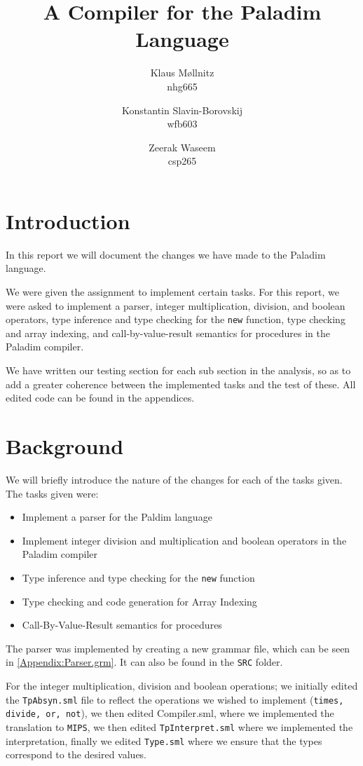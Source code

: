 \documentclass[10pt]{article}
\title{A Compiler for the \textbf{Paladim} Language}
\author{
    Klaus Møllnitz\\
    nhg665
  \and
    Konstantin Slavin-Borovskij\\
    wfb603
  \and
    Zeerak Waseem\\
    csp265
}
\begin{document}
\maketitle

\newpage
\tableofcontents
\section{Introduction}
In this report we will document the changes we have made to the Paladim language. 

We were given the assignment to implement certain tasks. For this report, we were asked to implement a parser, integer multiplication, division, and boolean operators, type inference and type checking for the \texttt{new} function, type checking and array indexing, and call-by-value-result semantics for procedures in the Paladim compiler.

We have written our testing section for each sub section in the analysis, so as to add a greater coherence between the implemented tasks and the test of these. All edited code can be found in the appendices.

\section{Background}

We will briefly introduce the nature of the changes for each of the tasks given. The tasks given were:
\begin{itemize}
\item Implement a parser for the Paldim language
\item Implement integer division and multiplication and boolean operators in the Paladim compiler
\item Type inference and type checking for the \texttt{new} function
\item Type checking and code generation for Array Indexing
\item Call-By-Value-Result semantics for procedures
\end{itemize}

The parser was implemented by creating a new grammar file, which can be seen in \ref{Appendix:Parser.grm}. It can also be found in the \texttt{SRC} folder.

For the integer multiplication, division and boolean operations; we initially edited the \texttt{TpAbsyn.sml} file to reflect the operations we wished to implement (\texttt{times, divide, or, not}), we then edited Compiler.sml, where we implemented the translation to \texttt{MIPS}, we then edited \texttt{TpInterpret.sml} where we implemented the interpretation, finally we edited \texttt{Type.sml} where we ensure that the types correspond to the desired values.
\end{document}
